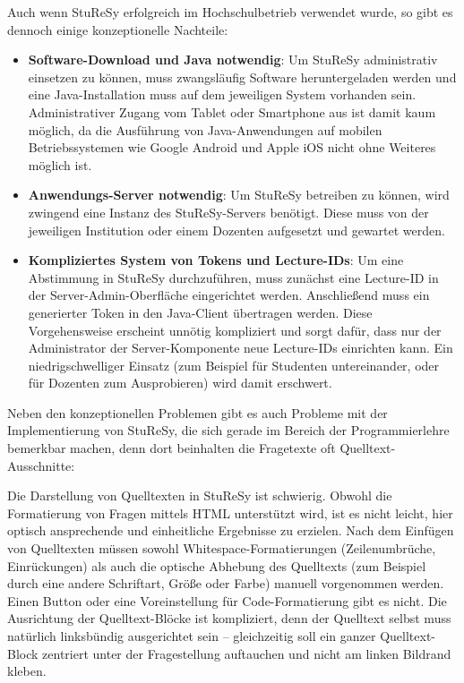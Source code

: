 Auch wenn StuReSy erfolgreich im Hochschulbetrieb verwendet wurde, so gibt es dennoch einige konzeptionelle Nachteile:
\begin{itemize}
    \item \textbf{Software-Download und Java notwendig}: Um StuReSy administrativ einsetzen zu können, muss zwangsläufig Software heruntergeladen werden und eine Java-Installation muss auf dem jeweiligen System vorhanden sein. Administrativer Zugang vom Tablet oder Smartphone aus ist damit kaum möglich, da die Ausführung von Java-Anwendungen auf mobilen Betriebssystemen wie Google Android und Apple iOS nicht ohne Weiteres möglich ist.
    \item \textbf{Anwendungs-Server notwendig}: Um StuReSy betreiben zu können, wird zwingend eine Instanz des StuReSy-Servers benötigt. Diese muss von der jeweiligen Institution oder einem Dozenten aufgesetzt und gewartet werden.
    \item \textbf{Kompliziertes System von Tokens und Lecture-IDs}: Um eine Abstimmung in StuReSy durchzuführen, muss zunächst eine Lecture-ID in der Server-Admin-Oberfläche eingerichtet werden. Anschließend muss ein generierter Token in den Java-Client übertragen werden. Diese Vorgehensweise erscheint unnötig kompliziert und sorgt dafür, dass nur der Administrator der Server-Komponente neue Lecture-IDs einrichten kann. Ein niedrigschwelliger Einsatz (zum Beispiel für Studenten untereinander, oder für Dozenten zum Ausprobieren) wird damit erschwert.
\end{itemize}

Neben den konzeptionellen Problemen gibt es auch Probleme mit der Implementierung von StuReSy, die sich gerade im Bereich der Programmierlehre bemerkbar machen, denn dort beinhalten die Fragetexte oft Quelltext-Ausschnitte:

Die Darstellung von Quelltexten in StuReSy ist schwierig. Obwohl die Formatierung von Fragen mittels HTML unterstützt wird, ist es nicht leicht, hier optisch ansprechende und einheitliche Ergebnisse zu erzielen. Nach dem Einfügen von Quelltexten müssen sowohl Whitespace-Formatierungen (Zeilenumbrüche, Einrückungen) als auch die optische Abhebung des Quelltexts (zum Beispiel durch eine andere Schriftart, Größe oder Farbe) manuell vorgenommen werden. Einen Button oder eine Voreinstellung für Code-Formatierung gibt es nicht. Die Ausrichtung der Quelltext-Blöcke ist kompliziert, denn der Quelltext selbst muss natürlich linksbündig ausgerichtet sein – gleichzeitig soll ein ganzer Quelltext-Block zentriert unter der Fragestellung auftauchen und nicht am linken Bildrand kleben.

